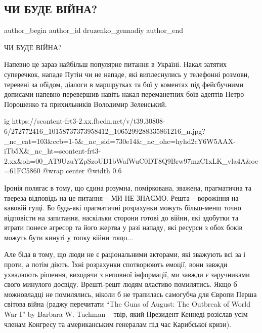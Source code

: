  
 
 
 
 
 
\subsection{ЧИ БУДЕ ВІЙНА?}
\label{sec:29_01_2022.fb.druzenko_gennadiy.1.chy_bude_vijna}
 
\ifcmt
 author_begin
   author_id druzenko_gennadiy
 author_end
\fi

ЧИ БУДЕ ВІЙНА?

Напевно це зараз найбільш популярне питання в Україні. Накал затятих
суперечкок, нападе Путін чи не нападе, які виплеснулись у телефонні розмови,
теревені за обідом, діалоги в маршрутках та бої у коментах під фейсбучними
дописами напевно перевершив навіть накал переманетних боїв адептів Петро
Порошенко та прихильників Володимир Зеленський.

\ifcmt
  ig https://scontent-frt3-2.xx.fbcdn.net/v/t39.30808-6/272772416_10158737373958412_1065299288335861216_n.jpg?_nc_cat=103&ccb=1-5&_nc_sid=730e14&_nc_ohc=hyhd2cY6W5AAX-iTb5X&_nc_ht=scontent-frt3-2.xx&oh=00_AT9UzuYZpSzoUD1bWafWuC0DT8Q9Brw97mzC1xLK_vla4A&oe=61FC5860
	@wrap center
	@width 0.6
\fi

Іронія полягає в тому, що єдина розумна, поміркована, зважена, прагматична та
твереза відповідь на це питання – МИ НЕ ЗНАЄМО. Решта – ворожіння на кавовій
гущі. Бо будь-які прагматичні розрахунки можуть більш-менш точно відповісти на
запитання, наскільки сторони готові до війни, які здобутки та втрати понесе
агресор та його жертва у разі нападу, які ресурси з обох боків можуть бути
кинуті у топку війни тощо...

Але біда в тому, що люди не є раціональними акторами, які зважують всі за і
проти, а потім діють. Їхні розрахунки спотворюють емоції, вони завжди ухвалюють
рішення, виходячи з неповної інформації, ми завжди є заручниками свого минулого
досвіду. Врешті-решт людям властиво помилятись. Якщо б можновладці не
помилялись, ніколи б не трапилась самогубча для Європи Перша світова війна
(раджу перечитати \enquote{The Guns of August: The Outbreak of World War I} by Barbara
W. Tuchman – твір, який Президент Кеннеді розіслав усім членам Конгресу та
американським генералам під час Карибської кризи).

